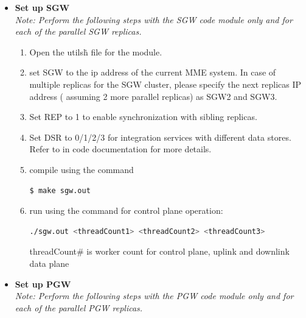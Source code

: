 \pdfminorversion=4\documentclass[hidelinks]{report}
\begin{document}
\begin{enumerate}
\begin{itemize}
\begin{enumerate}
\end{enumerate}

\item \textbf{Set up SGW}\\

\textit{Note: Perform the following steps with the SGW code module only and for each of the parallel SGW replicas.}
\begin{enumerate}

\item Open the utils\.h file for the module.
\item set SGW to the ip address of the current MME system. In case of multiple replicas for the SGW cluster, please specify the next replicas IP address ( assuming 2 more parallel replicas) as SGW2 and SGW3.
\item Set REP to 1 to enable synchronization with sibling replicas.
\item Set DSR to 0/1/2/3 for integration services with different data stores. Refer to in code documentation for more details.
\item compile using the command 
\begin{lstlisting}[language=bash]
$ make sgw.out
\end{lstlisting}
\item run using the command for control plane operation:
\begin{lstlisting}[language=bash]
./sgw.out <threadCount1> <threadCount2> <threadCount3> 

\end{lstlisting}
threadCount\# is worker count for control plane, uplink and downlink data plane

\end{enumerate}
\item \textbf{Set up PGW}\\

\textit{Note: Perform the following steps with the PGW code module only and for each of the parallel PGW replicas.}
\begin{enumerate}


\end{enumerate}
\end{itemize}
\end{enumerate}
\end{document}
